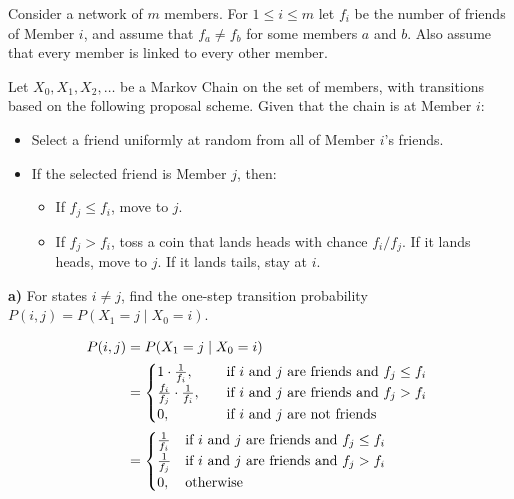 \documentclass[11pt]{article}
\begin{document}
Consider a network of \(m\) members. For \(1 \le i \le m\) let \(f_i\)
be the number of friends of Member \(i\), and assume that
\(f_a \ne f_b\) for some members \(a\) and \(b\). Also assume that every
member is linked to every other member.

Let \(X_0, X_1, X_2, \ldots\) be a Markov Chain on the set of members,
with transitions based on the following proposal scheme. Given that the
chain is at Member \(i\):

\begin{itemize}
\item
  Select a friend uniformly at random from all of Member \(i\)'s
  friends.
\item
  If the selected friend is Member \(j\), then:

  \begin{itemize}
  \item
    If \(f_j \le f_i\), move to \(j\).
  \item
    If \(f_j > f_i\), toss a coin that lands heads with chance
    \(f_i / f_j\). If it lands heads, move to \(j\). If it lands tails,
    stay at \(i\).
  \end{itemize}
\end{itemize}

\textbf{a)} For states \(i \ne j\), find the one-step transition
probability \(P(i, j) = P(X_1 = j \mid X_0=i)\).

\begin{align*}
	P(i, j) &= P(X_1 = j \mid X_0=i) \\
	&= \begin{cases}
		1 \cdot \frac{1}{f_{i}}, \quad &\text{if $ i $ and $ j$ are friends and $ f_{j}  \le f_{i}$} \\
		\frac{f_{i}}{f_{j}} \cdot \frac{1}{f_{i}}, \quad &\text{if $ i $ and $ j $ are friends and $ f_{j} > f_{i} $ } \\
		0, \quad &\text{if $ i $ and $ j $ are not friends}
	\end{cases} \\
	&= \begin{cases}
		\frac{1}{f_{i}} & \text{if $ i $ and $ j $ are friends and $ f_{j} \le f_{i} $ }\\
		\frac{1}{f_{j}} & \text{if $ i $ and $ j $ are friends and $ f_{j} > f_{i}$} \\
		0, &\text{otherwise}
	\end{cases} \\
\end{align*}
\end{document}

